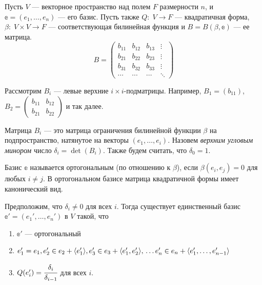 Пусть $V$ --- векторное пространство над полем $F$ размерности $n$, и $\mathbb{e} = (e_1, \ldots, e_n)$ --- его базис. Пусть также $Q\colon \; V \to F$ --- квадратичная форма, $\beta\colon\; V\times V \to F$ --- соответствующая билинейная функция и $B = B(\beta, \mathbb{e})$ --- ее матрица.
$$
B = \begin{pmatrix}
	b_{11}& b_{12} & b_{13} & \vdots\\
	b_{21}& b_{22} & b_{23} & \vdots\\
	b_{31}& b_{32}& b_{33} & \vdots\\
	\cdots& \cdots& \cdots& \ddots
\end{pmatrix}
$$

Рассмотрим $B_i$ --- левые верхние $i\times i$-подматрицы. Например, $B_1 = (b_{11})$, $B_2 = \begin{pmatrix}
	b_{11}& b_{12}\\
	b_{21}& b_{22}
\end{pmatrix}$
и так далее.
\par Матрица $B_i$ --- это матрица ограничения билинейной функции $\beta$ на подпространство, натянутое на векторы $(e_1, \ldots, e_i)$. Назовем \textit{верхним угловым минором} число $\delta_i = \det(B_i)$. Также будем считать, что $\delta_0 = 1$. 
\begin{Def}
	Базис $\mathbb{e}$ называется ортогональным (по отношению к $\beta$), если $\beta(e_i, e_j) = 0$ для любых $i \neq j$. В ортогональном базисе матрица квадратичной формы имеет канонический вид.
\end{Def}
\begin{Theorem}
		Предположим, что $\delta_i \neq 0$ для всех $i$. Тогда существует единственный  базис $\mathbb{e}' = (e_1', \ldots, e_n')$ в $V$ такой, что
		\begin{enumerate}
			\item $\mathbb{e}'$ --- ортогональный
			\item $e_1' = e_1,\\ e_2' \in e_2 + \langle e_1'\rangle,\\ e_3' \in  e_3 + \langle e_1', e_2' \rangle,\\ \ldots\\ e_n' \in  e_n + \langle e_1', \ldots, e_{n-1}'\rangle$
			\item $Q(e_i') = \cfrac{\delta_i}{\delta_{i-1}}$ для всех $i$.
		\end{enumerate}	
\end{Theorem}
